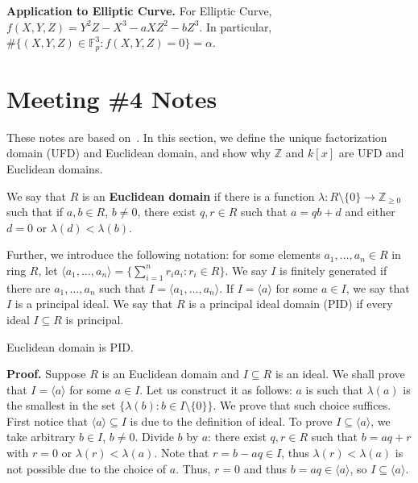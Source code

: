 \documentclass{template}
\begin{document}
\textbf{Application to Elliptic Curve.} For Elliptic Curve, $f(X,Y,Z) = Y^2Z -
X^3 - aXZ^2 - bZ^3$. In particular, $\#\{(X,Y,Z) \in \mathbb{F}_p^3:
f(X,Y,Z)=0\} = \alpha$.

\newpage

\section{Meeting \#4 Notes}

These notes are based on~\cite[Section 1]{ireland}. In this section, we define
the unique factorization domain (UFD) and Euclidean domain, and show why
$\mathbb{Z}$ and $k[x]$ are UFD and Euclidean domains.

\begin{definition}
    We say that $R$ is an \textbf{Euclidean domain} if there is a function
    $\lambda: R \setminus \{0\} \to \mathbb{Z}_{\geq 0}$ such that if $a,b \in
    R$, $b \neq 0$, there exist $q,r \in R$ such that $a = qb + d$ and either
    $d=0$ or $\lambda(d) < \lambda(b)$.
\end{definition}

Further, we introduce the following notation: for some elements $a_1,\dots,a_n
\in R$ in ring $R$, let $\langle a_1,\dots,a_n \rangle = \{\sum_{i=1}^n r_ia_i:
r_i \in R\}$. We say $I$ is finitely generated if there are $a_1,\dots,a_n$ such
that $I = \langle a_1,\dots,a_n \rangle$. If $I = \langle a \rangle$ for some $a
\in I$, we say that $I$ is a principal ideal. We say that $R$ is a principal
ideal domain (PID) if every ideal $I \subseteq R$ is principal.

\begin{theorem}
    Euclidean domain is PID.
\end{theorem}

\textbf{Proof.} Suppose $R$ is an Euclidean domain and $I \subseteq R$ is an
ideal. We shall prove that $I = \langle a \rangle$ for some $a \in I$. Let us
construct it as follows: $a$ is such that $\lambda(a)$ is the smallest in the
set $\{\lambda(b): b \in I \setminus \{0\}\}$. We prove that such choice
suffices. First notice that $\langle a \rangle \subseteq I$ is due to the
definition of ideal. To prove $I \subseteq \langle a \rangle$, we take arbitrary
$b \in I$, $b \neq 0$. Divide $b$ by $a$: there exist $q,r \in R$ such that $b =
aq+r$ with $r=0$ or $\lambda(r) < \lambda(a)$. Note that $r=b-aq \in I$, thus
$\lambda(r) < \lambda(a)$ is not possible due to the choice of $a$. Thus, $r=0$
and thus $b=aq \in \langle a \rangle$, so $I \subseteq \langle a \rangle$.
\end{document}
